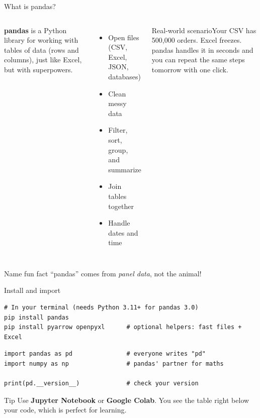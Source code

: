 \documentclass[aspectratio=169,10pt]{beamer}
\newcommand{\scenario}[1]{\begin{exampleblock}{Real-world scenario}#1\end{exampleblock}}
\begin{document}
\begin{frame}{What is pandas?}
  \begin{columns}[T]
    \textbf{pandas} is a Python library for working with \alert{tables of data}
    (rows and columns), just like Excel, but with superpowers.
    \begin{itemize}
      \item Open files (CSV, Excel, JSON, databases)
      \item Clean messy data
      \item Filter, sort, group, and summarize
      \item Join tables together
      \item Handle dates and time
    \end{itemize}
    \scenario{Your CSV has 500{,}000 orders. Excel freezes. pandas handles it in seconds
    and you can repeat the same steps tomorrow with one click.}
  \end{columns}
  \vspace{1mm}
  \begin{alertblock}{Name fun fact}
    ``pandas'' comes from \emph{panel data}, not the animal!
  \end{alertblock}
\end{frame}

\begin{frame}[fragile]{Install and import}
\begin{lstlisting}
# In your terminal (needs Python 3.11+ for pandas 3.0)
pip install pandas
pip install pyarrow openpyxl      # optional helpers: fast files + Excel
\end{lstlisting}
\begin{lstlisting}
import pandas as pd               # everyone writes "pd"
import numpy as np                # pandas' partner for maths

print(pd.__version__)             # check your version
\end{lstlisting}
  \begin{block}{Tip}
    Use \textbf{Jupyter Notebook} or \textbf{Google Colab}. You see the table right below
    your code, which is perfect for learning.
  \end{block}
\end{frame}
\end{document}
